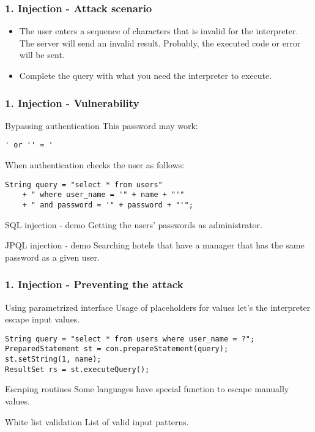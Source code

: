 \begin{frame}
\frametitle{1. Injection - Attack scenario}
\begin{itemize}
\item The user enters a sequence of characters that is invalid for the
	interpreter. The server will send an invalid result.
	Probably, the executed code or error will be sent.
\item Complete the query with what you need the interpreter to execute.
\end{itemize}
\end{frame}

\begin{frame}[fragile]
\frametitle{1. Injection - Vulnerability}
\begin{exampleblock}{Bypassing authentication}
This password may work:
\begin{lstlisting}
' or '' = '
\end{lstlisting}
When authentication checks the user as follows:
\begin{lstlisting}
String query = "select * from users"
	+ " where user_name = '" + name + "'"
	+ " and password = '" + password + "'";
\end{lstlisting}
\end{exampleblock}
\pause
\begin{exampleblock}{SQL injection - demo}
Getting the users' passwords as administrator.
\end{exampleblock}
\pause
\begin{exampleblock}{JPQL injection - demo}
Searching hotels that have a manager that has the same password as a given
user.
\end{exampleblock}
\end{frame}

\begin{frame}[fragile]
\frametitle{1. Injection - Preventing the attack}
\begin{block}{Using parametrized interface}
Usage of placeholders for values let's the interpreter escape input values.
\begin{lstlisting}
String query = "select * from users where user_name = ?";
PreparedStatement st = con.prepareStatement(query);
st.setString(1, name);
ResultSet rs = st.executeQuery();
\end{lstlisting}
\end{block}
\begin{block}{Escaping routines}
Some languages have special function to escape manually values.
\end{block}
\begin{block}{White list validation}
List of valid input patterns.
\end{block}
\end{frame}

